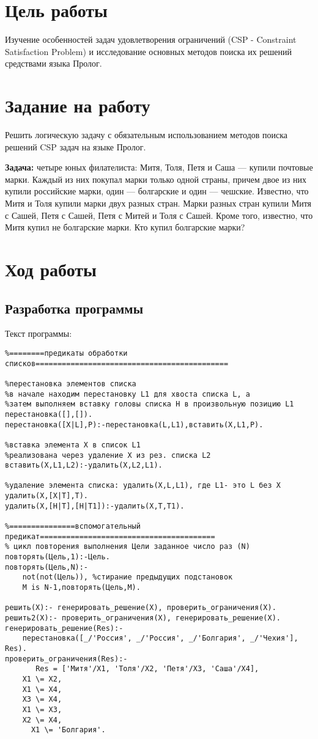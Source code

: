 \documentclass[a4paper,14pt]{extarticle}
\begin{document}


\section{Цель работы}
Изучение особенностей задач удовлетворения ограничений (CSP - Constraint
Satisfaction Problem) и исследование основных методов поиска их решений
средствами языка Пролог.

\section{Задание на работу}
Решить логическую задачу с обязательным использованием методов поиска решений
CSP задач на языке Пролог.

\textbf{Задача:} четыре юных филателиста: Митя, Толя, Петя и Саша — купили
почтовые марки. Каждый из них покупал марки только одной страны, причем двое из
них купили российские марки, один — болгарские и один — чешские. Известно, что
Митя и Толя купили марки двух разных стран. Марки разных стран купили Митя с
Сашей, Петя с Сашей, Петя с Митей и Толя с Сашей. Кроме того, известно, что Митя
купил не болгарские марки. Кто купил болгарские марки?

\section{Ход работы}
\subsection{Разработка программы}
Текст программы:
\begin{lstlisting}
%========предикаты обработки списков============================================

%перестановка элементов списка
%в начале находим перестановку L1 для хвоста списка L, а
%затем выполняем вставку головы списка H в произвольную позицию L1
перестановка([],[]).
перестановка([X|L],P):-перестановка(L,L1),вставить(X,L1,P).

%вставка элемента Х в список L1
%реализована через удаление X из рез. списка L2
вставить(X,L1,L2):-удалить(X,L2,L1).

%удаление элемента списка: удалить(X,L,L1), где L1- это L без X
удалить(X,[X|T],T).
удалить(X,[Н|T],[Н|T1]):-удалить(X,T,T1).

%===============вспомогательный предикат========================================
% цикл повторения выполнения Цели заданное число раз (N)
повторять(Цель,1):-Цель.
повторять(Цель,N):-
	not(not(Цель)), %стирание предыдущих подстановок
	M is N-1,повторять(Цель,M).

решить(X):- генерировать_решение(X), проверить_ограничения(X).
решить2(X):- проверить_ограничения(X), генерировать_решение(X).
генерировать_решение(Res):-
	перестановка([_/'Россия', _/'Россия', _/'Болгария', _/'Чехия'], Res).
проверить_ограничения(Res):-
       Res = ['Митя'/X1, 'Толя'/X2, 'Петя'/X3, 'Саша'/X4],   
	X1 \= X2,
	X1 \= X4,
	X3 \= X4,
	X1 \= X3,
	X2 \= X4,
	  X1 \= 'Болгария'.
\end{lstlisting}
\end{document}
